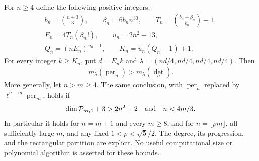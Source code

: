 \begin{proposition}\label{G-11}
For $n\geq4$ define the following positive integers:
\[
\begin{gathered}
 b_n=\binom{n+3}{3},\qquad \beta_n=6b_n n^{30},\qquad
 T_n=\binom{b_n+\beta_n}{b_n}-1,\\
 E_n=4T_n(\beta_n!),\qquad u_n=2n^2-13,\\
 Q_n=(nE_n)^{u_n-1},\qquad K_n=u_n(Q_n-1)+1.
\end{gathered}
\]
For every integer $k\geq K_n$, put $d=E_n k$ and
$\lambda=(nd/4,nd/4,nd/4,nd/4)$. Then
\begin{equation}\label{G11:rectangle}
 m_\lambda(\operatorname{per}_n)>m_\lambda(\det_n).
\end{equation}
More generally, let $n>m\geq4$. The same conclusion, with
$\operatorname{per}_n$ replaced by
$\ell^{n-m}\operatorname{per}_m$, holds if
\begin{equation}\label{G11:padded-hypotheses}
 \dim\mathcal P_{m,4}+3>2n^2+2
 \quad\hbox{and}\quad n<4m/3.
\end{equation}
In particular it holds for $n=m+1$ and every $m\geq8$, and
for $n=\lfloor\rho m\rfloor$, all sufficiently large $m$,
and any fixed $1<\rho<\sqrt5/2$.
The degree, its progression, and the rectangular partition are
explicit. No useful computational size or polynomial algorithm
is asserted for these bounds.
\end{proposition}
